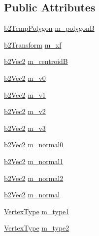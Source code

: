 \subsection*{Public Attributes}
\begin{DoxyCompactItemize}
\item 
\mbox{\hyperlink{structb2_temp_polygon}{b2\+Temp\+Polygon}} \mbox{\hyperlink{structb2_e_p_collider_ae01f6c0b04cc1b24af41c5772fd1d96a}{m\+\_\+polygonB}}
\item 
\mbox{\hyperlink{structb2_transform}{b2\+Transform}} \mbox{\hyperlink{structb2_e_p_collider_a096b61a983a24fa26ee3089b4ec59ab8}{m\+\_\+xf}}
\item 
\mbox{\hyperlink{structb2_vec2}{b2\+Vec2}} \mbox{\hyperlink{structb2_e_p_collider_a8635888e0c36a76b08b0b0ec7cf6e6e9}{m\+\_\+centroidB}}
\item 
\mbox{\hyperlink{structb2_vec2}{b2\+Vec2}} \mbox{\hyperlink{structb2_e_p_collider_a309b7ea4262921a25ba1f14b002375ee}{m\+\_\+v0}}
\item 
\mbox{\hyperlink{structb2_vec2}{b2\+Vec2}} \mbox{\hyperlink{structb2_e_p_collider_a710cbfefe79857ef97363a932be23048}{m\+\_\+v1}}
\item 
\mbox{\hyperlink{structb2_vec2}{b2\+Vec2}} \mbox{\hyperlink{structb2_e_p_collider_a9888184f541622203bed3087c896eb0e}{m\+\_\+v2}}
\item 
\mbox{\hyperlink{structb2_vec2}{b2\+Vec2}} \mbox{\hyperlink{structb2_e_p_collider_a4a866752c895e5239e251d9903d281f4}{m\+\_\+v3}}
\item 
\mbox{\hyperlink{structb2_vec2}{b2\+Vec2}} \mbox{\hyperlink{structb2_e_p_collider_ac2c16435adf5cfa90817399dbfe9ce89}{m\+\_\+normal0}}
\item 
\mbox{\hyperlink{structb2_vec2}{b2\+Vec2}} \mbox{\hyperlink{structb2_e_p_collider_abe08dfafd360c41c5ae80a30840b7d63}{m\+\_\+normal1}}
\item 
\mbox{\hyperlink{structb2_vec2}{b2\+Vec2}} \mbox{\hyperlink{structb2_e_p_collider_aaec4f7ff250911272c054e3bfe65e08b}{m\+\_\+normal2}}
\item 
\mbox{\hyperlink{structb2_vec2}{b2\+Vec2}} \mbox{\hyperlink{structb2_e_p_collider_a67ff23f9fada3a733928380da8653348}{m\+\_\+normal}}
\item 
\mbox{\hyperlink{structb2_e_p_collider_aa50efcaf41cf85e167d0244f5d6f00e8}{Vertex\+Type}} \mbox{\hyperlink{structb2_e_p_collider_ad2541e4c9358d5ffcaca19b25836392b}{m\+\_\+type1}}
\item 
\mbox{\hyperlink{structb2_e_p_collider_aa50efcaf41cf85e167d0244f5d6f00e8}{Vertex\+Type}} \mbox{\hyperlink{structb2_e_p_collider_a71889f34bef412e3cbfbbab605210b7e}{m\+\_\+type2}}

\end{DoxyCompactItemize}
